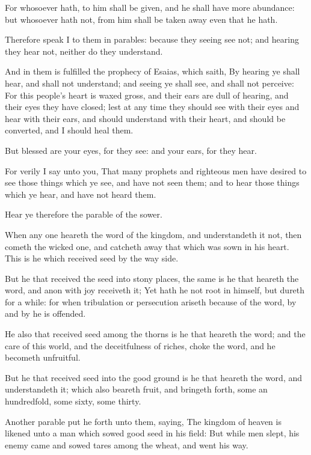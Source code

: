 \verse For whosoever hath, to him shall be given, and he shall have more abundance: but whosoever hath not, from him shall be taken away even that he hath.

\verse Therefore speak I to them in parables: because they seeing see not; and hearing they hear not, neither do they understand.

\verse And in them is fulfilled the prophecy of Esaias, which saith, By hearing ye shall hear, and shall not understand; and seeing ye shall see, and shall not perceive: \verse For this people's heart is waxed gross, and their ears are dull of hearing, and their eyes they have closed; lest at any time they should see with their eyes and hear with their ears, and should understand with their heart, and should be converted, and I should heal them.

\verse But blessed are your eyes, for they see: and your ears, for they hear.

\verse For verily I say unto you, That many prophets and righteous men have desired to see those things which ye see, and have not seen them; and to hear those things which ye hear, and have not heard them.

\verse Hear ye therefore the parable of the sower.

\verse When any one heareth the word of the kingdom, and understandeth it not, then cometh the wicked one, and catcheth away that which was sown in his heart. This is he which received seed by the way side.

\verse But he that received the seed into stony places, the same is he that heareth the word, and anon with joy receiveth it; \verse Yet hath he not root in himself, but dureth for a while: for when tribulation or persecution ariseth because of the word, by and by he is offended.

\verse He also that received seed among the thorns is he that heareth the word; and the care of this world, and the deceitfulness of riches, choke the word, and he becometh unfruitful.

\verse But he that received seed into the good ground is he that heareth the word, and understandeth it; which also beareth fruit, and bringeth forth, some an hundredfold, some sixty, some thirty.

\verse Another parable put he forth unto them, saying, The kingdom of heaven is likened unto a man which sowed good seed in his field: \verse But while men slept, his enemy came and sowed tares among the wheat, and went his way.

